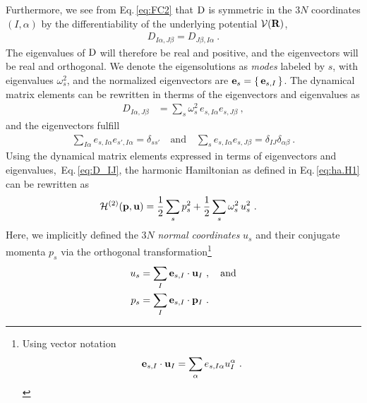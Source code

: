  Furthermore, we see from Eq.\,\eqref{eq:FC2} that $\rm D$ is symmetric in the $3N$ coordinates $(I, \alpha)$ by the differentiability of the underlying potential $\mathcal V ({\bf R})$,
\begin{align}
	D_{I \alpha, J \beta} = D_{J \beta, I \alpha}~.
	\label{eq:D.symmetric}
\end{align}
The eigenvalues of $\rm D$ will therefore be real and positive, and the eigenvectors will be real and orthogonal. We denote the eigensolutions as \emph{modes} labeled by $s$, with eigenvalues $\omega_s^2$, and the normalized eigenvectors are ${\bf e}_s = \set{{\bf e}_{s, I}}$. The dynamical matrix elements can be rewritten in therms of the eigenvectors and eigenvalues as
\begin{align}
		D_{I \alpha, J \beta}
			&= \sum_s \omega^2_s \, e_{s, I \alpha} e_{s, J \beta}~,
			\label{eq:D_IJ}
\end{align}
and the eigenvectors fulfill
\begin{align}
	\sum_{I \alpha} e_{s, I \alpha} e_{s', I \alpha} = \delta_{s s'}
	\quad \text{and} \quad
	\sum_{s} e_{s, I \alpha} e_{s, J \beta} = \delta_{IJ} \delta_{\alpha \beta}~.
	\label{eq:completeness.e_s}
\end{align}
Using the dynamical matrix elements expressed in terms of eigenvectors and eigenvalues,~Eq.\,\eqref{eq:D_IJ}, the harmonic Hamiltonian as defined in Eq.\,\eqref{eq:ha.H1} can be rewritten as
\begin{align}
	\mathcal{H}^{(2)}({\bf p},  {\bf u})
		&= \halb \sum_s p_s^2 + 
		\halb \sum_{s} \omega_s^2	\, u_s^2~.
\label{eq:ha.H2}
\end{align}
Here, we implicitly defined the $3N$ \emph{normal coordinates} $u_s$ and their conjugate momenta $p_s$ via the orthogonal transformation\footnote{Using vector notation $${\bf e}_{s, I} \cdot {\bf u}_I = \sum_{\alpha} e_{s, I \alpha} u_I^\alpha~.$$}
\begin{align}
	u_s
		&= \sum_{I} {\bf e}_{s, I} \cdot {\bf u}_{I}~,\quad\text{and}
		\label{eq:u_s} \\
	p_s
	&=\sum_{I} {\bf e}_{s, I} \cdot {\bf p}_{I} ~.
		\label{eq:p_s}
\end{align}
